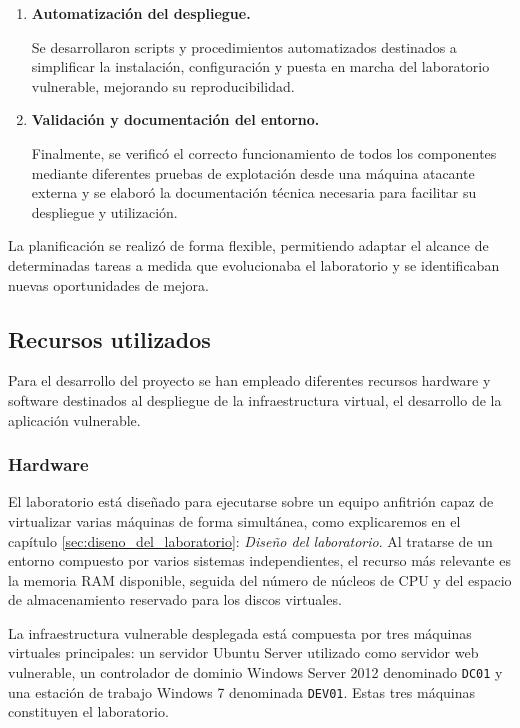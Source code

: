 \begin{enumerate}
    \item \textbf{Automatización del despliegue.}

    Se desarrollaron scripts y procedimientos automatizados destinados a simplificar la instalación, configuración y puesta en marcha del laboratorio vulnerable, mejorando su reproducibilidad.

    \item \textbf{Validación y documentación del entorno.}

    Finalmente, se verificó el correcto funcionamiento de todos los componentes mediante diferentes pruebas de explotación desde una máquina atacante externa y se elaboró la documentación técnica necesaria para facilitar su despliegue y utilización.

\end{enumerate}

La planificación se realizó de forma flexible, permitiendo adaptar el alcance de determinadas tareas a medida que evolucionaba el laboratorio y se identificaban nuevas oportunidades de mejora.

\subsection{Recursos utilizados}

Para el desarrollo del proyecto se han empleado diferentes recursos hardware y software destinados al despliegue de la infraestructura virtual, el desarrollo de la aplicación vulnerable.

\subsubsection{Hardware}

El laboratorio está diseñado para ejecutarse sobre un equipo anfitrión capaz de virtualizar varias máquinas de forma simultánea, como explicaremos en el capítulo \ref{sec:diseno_del_laboratorio}: \textit{Diseño del laboratorio}. Al tratarse de un entorno compuesto por varios sistemas independientes, el recurso más relevante es la memoria RAM disponible, seguida del número de núcleos de CPU y del espacio de almacenamiento reservado para los discos virtuales.

La infraestructura vulnerable desplegada está compuesta por tres máquinas virtuales principales: un servidor Ubuntu Server utilizado como servidor web vulnerable, un controlador de dominio Windows Server 2012 denominado \texttt{DC01} y una estación de trabajo Windows 7 denominada \texttt{DEV01}. Estas tres máquinas constituyen el laboratorio.

